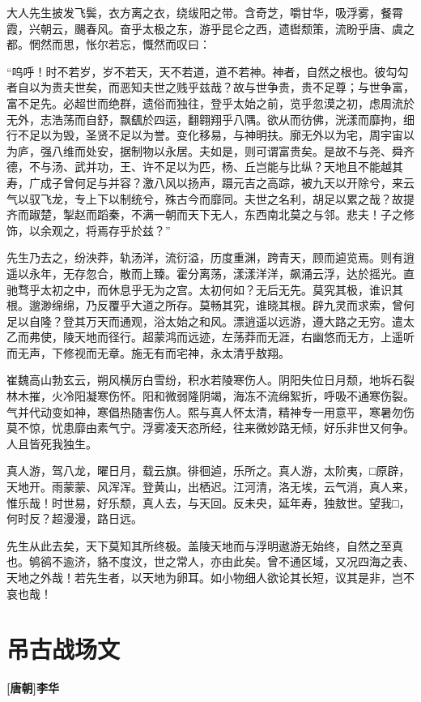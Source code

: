 \documentclass[UTF8,titlepage,oneside]{ctexbook}
\begin{document}
大人先生披发飞鬓，衣方离之衣，绕绂阳之带。含奇芝，嚼甘华，吸浮雾，餐霄霞，兴朝云，颺春风。奋乎太极之东，游乎昆仑之西，遗辔颓策，流盼乎唐、虞之都。惘然而思，怅尔若忘，慨然而叹曰：


“呜呼！时不若岁，岁不若天，天不若道，道不若神。神者，自然之根也。彼勾勾者自以为贵夫世矣，而恶知夫世之贱乎兹哉？故与世争贵，贵不足尊；与世争富，富不足先。必超世而绝群，遗俗而独往，登乎太始之前，览乎忽漠之初，虑周流於无外，志浩荡而自舒，飘颻於四运，翻翱翔乎八隅。欲从而彷佛，洸漾而靡拘，细行不足以为毁，圣贤不足以为誉。变化移易，与神明扶。廓无外以为宅，周宇宙以为庐，强八维而处安，据制物以永居。夫如是，则可谓富贵矣。是故不与尧、舜齐德，不与汤、武并功，王、许不足以为匹，杨、丘岂能与比纵？天地且不能越其寿，广成子曾何足与并容？激八风以扬声，蹑元吉之高踪，被九天以开除兮，来云气以驭飞龙，专上下以制统兮，殊古今而靡同。夫世之名利，胡足以累之哉？故提齐而踧楚，掣赵而蹈秦，不满一朝而天下无人，东西南北莫之与邻。悲夫！子之修饰，以余观之，将焉存乎於兹？”


先生乃去之，纷泱莽，轨汤洋，流衍溢，历度重渊，跨青天，顾而逌览焉。则有逍遥以永年，无存忽合，散而上臻。霍分离荡，漾漾洋洋，飙涌云浮，达於摇光。直驰骛乎太初之中，而休息乎无为之宫。太初何如？无后无先。莫究其极，谁识其根。邈渺绵绵，乃反覆乎大道之所存。莫畅其究，谁晓其根。辟九灵而求索，曾何足以自隆？登其万天而通观，浴太始之和风。漂逍遥以远游，遵大路之无穷。遣太乙而弗使，陵天地而径行。超蒙鸿而远迹，左荡莽而无涯，右幽悠而无方，上遥听而无声，下修视而无章。施无有而宅神，永太清乎敖翔。


崔魏高山勃玄云，朔风横厉白雪纷，积水若陵寒伤人。阴阳失位日月颓，地坼石裂林木摧，火冷阳凝寒伤怀。阳和微弱隆阴竭，海冻不流绵絮折，呼吸不通寒伤裂。气并代动变如神，寒倡热随害伤人。熙与真人怀太清，精神专一用意平，寒暑勿伤莫不惊，忧患靡由素气宁。浮雾凌天恣所经，往来微妙路无倾，好乐非世又何争。人且皆死我独生。


真人游，驾八龙，曜日月，载云旗。徘徊逌，乐所之。真人游，太阶夷，□原辟，天地开。雨蒙蒙、风浑浑。登黄山，出栖迟。江河清，洛无埃，云气消，真人来，惟乐哉！时世易，好乐颓，真人去，与天回。反未央，延年寿，独敖世。望我□，何时反？超漫漫，路日远。


先生从此去矣，天下莫知其所终极。盖陵天地而与浮明遨游无始终，自然之至真也。鸲鹆不逾济，貉不度汶，世之常人，亦由此矣。曾不通区域，又况四海之表、天地之外哉！若先生者，以天地为卵耳。如小物细人欲论其长短，议其是非，岂不哀也哉！



\chapter*{吊古战场文}
\begin{center}
	\textbf{[唐朝]李华}
\end{center}
\end{document}
